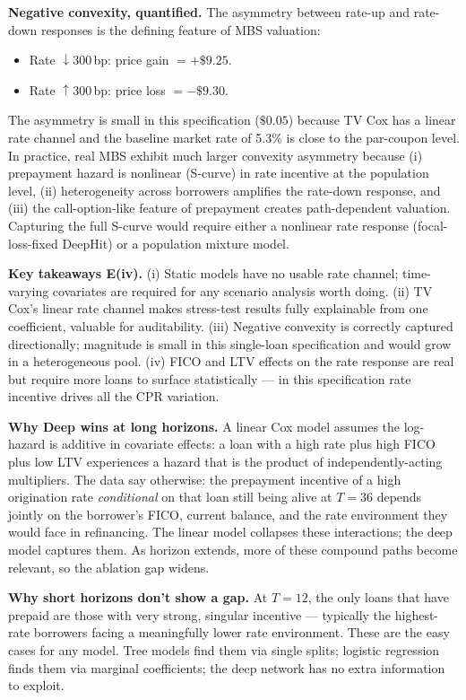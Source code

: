 \documentclass[11pt,a4paper]{article}
\begin{document}
\textbf{Negative convexity, quantified.} The asymmetry between rate-up and rate-down responses is the defining feature of MBS valuation:
\begin{itemize}[leftmargin=1.2em,itemsep=2pt,topsep=2pt]
  \item Rate $\downarrow 300$\,bp: price gain $= +\$9.25$.
  \item Rate $\uparrow 300$\,bp: price loss $= -\$9.30$.
\end{itemize}
The asymmetry is small in this specification ($\$0.05$) because TV Cox has a linear rate channel and the baseline market rate of 5.3\% is close to the par-coupon level. In practice, real MBS exhibit much larger convexity asymmetry because (i) prepayment hazard is nonlinear (S-curve) in rate incentive at the population level, (ii) heterogeneity across borrowers amplifies the rate-down response, and (iii) the call-option-like feature of prepayment creates path-dependent valuation. Capturing the full S-curve would require either a nonlinear rate response (focal-loss-fixed DeepHit) or a population mixture model.

\textbf{Key takeaways E(iv).} (i) Static models have no usable rate channel; time-varying covariates are required for any scenario analysis worth doing. (ii) TV Cox's linear rate channel makes stress-test results fully explainable from one coefficient, valuable for auditability. (iii) Negative convexity is correctly captured directionally; magnitude is small in this single-loan specification and would grow in a heterogeneous pool. (iv) FICO and LTV effects on the rate response are real but require more loans to surface statistically --- in this specification rate incentive drives all the CPR variation.



\textbf{Why Deep wins at long horizons.} A linear Cox model assumes the log-hazard is additive in covariate effects: a loan with a high rate plus high FICO plus low LTV experiences a hazard that is the product of independently-acting multipliers. The data say otherwise: the prepayment incentive of a high origination rate \emph{conditional} on that loan still being alive at $T{=}36$ depends jointly on the borrower's FICO, current balance, and the rate environment they would face in refinancing. The linear model collapses these interactions; the deep model captures them. As horizon extends, more of these compound paths become relevant, so the ablation gap widens.

\textbf{Why short horizons don't show a gap.} At $T{=}12$, the only loans that have prepaid are those with very strong, singular incentive --- typically the highest-rate borrowers facing a meaningfully lower rate environment. These are the easy cases for any model. Tree models find them via single splits; logistic regression finds them via marginal coefficients; the deep network has no extra information to exploit.
\end{document}
